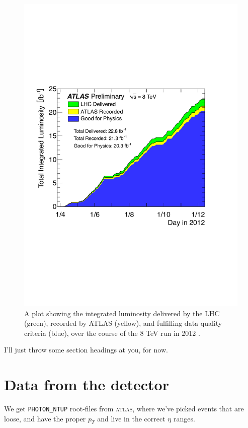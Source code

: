 \begin{figure}[htp]
\begin{minipage}[b]{.69\textwidth}
\hspace{-1em}\includegraphics[width=\textwidth]{figures/intlumi}
\end{minipage}\hfill\begin{minipage}[b]{.3\textwidth}
\caption{A plot showing the integrated luminosity delivered by the LHC (green), recorded by ATLAS (yellow), and fulfilling data quality criteria (blue), over the course of the 8 TeV run in 2012 \cite{publiclumi}.
\label{intlumi}}
\end{minipage}
\end{figure}

I'll just throw some section headings at you, for now.

\section{Data from the detector}
We get \texttt{PHOTON\_NTUP} root-files from \textsc{atlas}, where we've picked events that are loose, and have the proper $p_T$ and live in the correct $\eta$ ranges.

